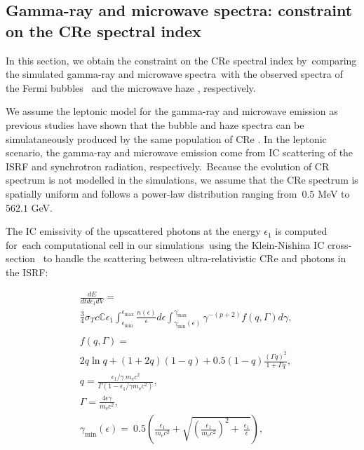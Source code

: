 \documentclass[fleqn,usenatbib,useAMS]{mnras}
\begin{document}
\subsection{Gamma-ray and microwave spectra: constraint on the CRe spectral index}
\label{sec:gamma-ray-microwave}
In this section, we obtain the constraint on the CRe spectral index by\
comparing the simulated gamma-ray and microwave spectra\
with the observed spectra of the Fermi bubbles \citep{Ackermann2014}\
and the microwave haze \citep{Dobler_2008}, respectively.\

We assume the leptonic model for the gamma-ray and microwave emission as previous studies have shown that the bubble and haze spectra can be simulataneously produced by the same population of CRe \citep{Su2010, Ackermann2014, Yang2022}. In the leptonic scenario, the gamma-ray and microwave emission come from IC scattering of the ISRF and synchrotron radiation, respectively.\
Because the evolution of CR spectrum is not modelled in the simulations, we assume that the CRe spectrum is spatially uniform and follows a power-law distribution ranging from\
$0.5$ MeV to $562.1$ GeV.


The IC emissivity of the upscattered photons at the energy $\epsilon_{1}$ is computed for\
each computational cell in our simulations\
using the Klein-Nishina IC cross-section \citep{Jones1968,BLUMENTHAL1970}\
to handle the scattering between ultra-relativistic CRe and photons in the ISRF:

\begin{subequations}
  \begin{align}
  &\frac{dE}{dtd\epsilon_{1}dV} =\nonumber\\
               &\frac{3}{4}\sigma_{T}c\mathbb{C}\epsilon_{1}\int^{\epsilon_{\text{max}}}_{\epsilon_{\text{min}}}
               \frac{n(\epsilon)}{\epsilon}d\epsilon\int^{\gamma_{\text{max}}}_{\gamma_{\text{min}}\left(\epsilon\right)}
               \gamma^{-(p+2)}f(q, \Gamma)d\gamma,\\
  \nonumber\\
  &f(q, \Gamma) =\nonumber\\
               &2q\ln q+(1+2q)(1-q)+0.5(1-q)\frac{\left(\Gamma q\right)^2}{1+\Gamma q},\\
  &q=\frac{\epsilon_{1}/\gamma\
               m_{\text{e}}c^{2}}{\Gamma\left(1-\epsilon_{1}/\gamma m_{\text{e}}c^{2}\right)},\\
  &\Gamma=\frac{4\epsilon \gamma}{m_{\text{e}}c^2},\\
  &\gamma_{\text{min}}(\epsilon)=\
   0.5\left(\frac{\epsilon_{1}}{m_{\text{e}}c^2}+\sqrt{\left(\frac{\epsilon_{1}}{m_{\text{e}}c^2}\right)^2+\
   \frac{\epsilon_{1}}{\epsilon}}\right) \label{gamma-min},
  \end{align}
\label{gammaray-emissivity}
\end{subequations}
\end{document}

